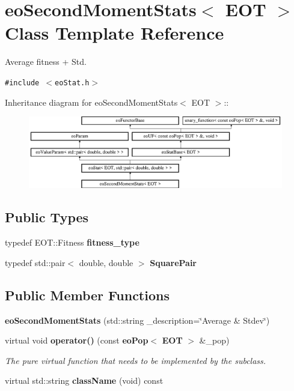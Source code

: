 \section{eo\-Second\-Moment\-Stats$<$ EOT $>$ Class Template Reference}
\label{classeo_second_moment_stats}
Average fitness + Std.  


{\tt \#include $<$eo\-Stat.h$>$}

Inheritance diagram for eo\-Second\-Moment\-Stats$<$ EOT $>$::\begin{figure}[H]
\begin{center}
\leavevmode
\includegraphics[height=3.15315cm]{classeo_second_moment_stats}
\end{center}
\end{figure}
\subsection*{Public Types}
\begin{CompactItemize}
\item 
typedef EOT::Fitness {\bf fitness\_\-type}\label{classeo_second_moment_stats_w0}

\item 
typedef std::pair$<$ double, double $>$ {\bf Square\-Pair}\label{classeo_second_moment_stats_w1}

\end{CompactItemize}
\subsection*{Public Member Functions}
\begin{CompactItemize}
\item 
{\bf eo\-Second\-Moment\-Stats} (std::string \_\-description=\char`\"{}Average \& Stdev\char`\"{})\label{classeo_second_moment_stats_a0}

\item 
virtual void {\bf operator()} (const {\bf eo\-Pop}$<$ {\bf EOT} $>$ \&\_\-pop)\label{classeo_second_moment_stats_a1}

\begin{CompactList}\small\item\em The pure virtual function that needs to be implemented by the subclass. \item\end{CompactList}\item 
virtual std::string {\bf class\-Name} (void) const \label{classeo_second_moment_stats_a2}

\end{CompactItemize}
